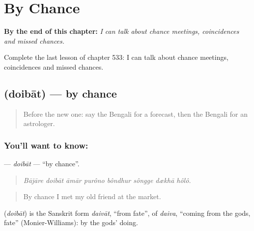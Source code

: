 
\chapter{By Chance}
\label{ch:bn-by-chance}

\begin{chapteropening}
\textbf{By the end of this chapter:} \emph{I can talk about chance meetings, coincidences and missed chances.}

Complete the last lesson of chapter 533: I can talk about chance meetings, coincidences and missed chances.
\end{chapteropening}

\section[\texorpdfstring{\bn{দৈবাৎ} (doibāt)}{দৈবাৎ (doibāt)}]{ (doibāt) — by chance}

\label{lesson:BN-C533-doibat}



\begin{quote}
Before the new one: say the Bengali for a forecast, then the Bengali for an astrologer.
\end{quote}

\subsection*{You'll want to know: }
\textbf{} — \emph{doibāt} — \textquotedblleft{}by chance\textquotedblright{}.

\begin{quote}
       
\end{quote}

\begin{quote}
\emph{Bājāre doibāt āmār purôno bôndhur sôngge dækhā hôlô.}
\end{quote}

\begin{quote}
By chance I met my old friend at the market.
\end{quote}

\begin{cousinweb}
\textbf{} (\emph{doibāt}) is the Sanskrit form \emph{daivāt}, \textquotedblleft{}from fate\textquotedblright{}, of \emph{daiva}, \textquotedblleft{}coming from the gods, fate\textquotedblright{} (Monier-Williams): by the gods' doing.
\end{cousinweb}

